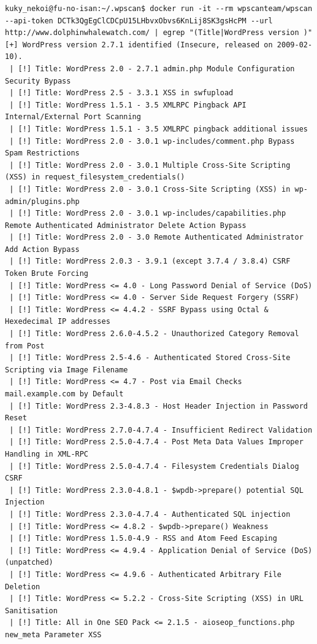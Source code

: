 \documentclass[11pt]{utalcaDoc}
\begin{document}
\begin{verbatim}
kuky_nekoi@fu-no-isan:~/.wpscan$ docker run -it --rm wpscanteam/wpscan --api-token DCTk3QgEgClCDCpU15LHbvxObvs6KnLij8SK3gsHcPM --url http://www.dolphinwhalewatch.com/ | egrep "(Title|WordPress version )"
[+] WordPress version 2.7.1 identified (Insecure, released on 2009-02-10).
 | [!] Title: WordPress 2.0 - 2.7.1 admin.php Module Configuration Security Bypass 
 | [!] Title: WordPress 2.5 - 3.3.1 XSS in swfupload
 | [!] Title: WordPress 1.5.1 - 3.5 XMLRPC Pingback API Internal/External Port Scanning
 | [!] Title: WordPress 1.5.1 - 3.5 XMLRPC pingback additional issues
 | [!] Title: WordPress 2.0 - 3.0.1 wp-includes/comment.php Bypass Spam Restrictions
 | [!] Title: WordPress 2.0 - 3.0.1 Multiple Cross-Site Scripting (XSS) in request_filesystem_credentials()
 | [!] Title: WordPress 2.0 - 3.0.1 Cross-Site Scripting (XSS) in wp-admin/plugins.php
 | [!] Title: WordPress 2.0 - 3.0.1 wp-includes/capabilities.php Remote Authenticated Administrator Delete Action Bypass
 | [!] Title: WordPress 2.0 - 3.0 Remote Authenticated Administrator Add Action Bypass
 | [!] Title: WordPress 2.0.3 - 3.9.1 (except 3.7.4 / 3.8.4) CSRF Token Brute Forcing
 | [!] Title: WordPress <= 4.0 - Long Password Denial of Service (DoS)
 | [!] Title: WordPress <= 4.0 - Server Side Request Forgery (SSRF)
 | [!] Title: WordPress <= 4.4.2 - SSRF Bypass using Octal & Hexedecimal IP addresses
 | [!] Title: WordPress 2.6.0-4.5.2 - Unauthorized Category Removal from Post
 | [!] Title: WordPress 2.5-4.6 - Authenticated Stored Cross-Site Scripting via Image Filename
 | [!] Title: WordPress <= 4.7 - Post via Email Checks mail.example.com by Default
 | [!] Title: WordPress 2.3-4.8.3 - Host Header Injection in Password Reset
 | [!] Title: WordPress 2.7.0-4.7.4 - Insufficient Redirect Validation
 | [!] Title: WordPress 2.5.0-4.7.4 - Post Meta Data Values Improper Handling in XML-RPC
 | [!] Title: WordPress 2.5.0-4.7.4 - Filesystem Credentials Dialog CSRF
 | [!] Title: WordPress 2.3.0-4.8.1 - $wpdb->prepare() potential SQL Injection
 | [!] Title: WordPress 2.3.0-4.7.4 - Authenticated SQL injection
 | [!] Title: WordPress <= 4.8.2 - $wpdb->prepare() Weakness
 | [!] Title: WordPress 1.5.0-4.9 - RSS and Atom Feed Escaping
 | [!] Title: WordPress <= 4.9.4 - Application Denial of Service (DoS) (unpatched)
 | [!] Title: WordPress <= 4.9.6 - Authenticated Arbitrary File Deletion
 | [!] Title: WordPress <= 5.2.2 - Cross-Site Scripting (XSS) in URL Sanitisation
 | [!] Title: All in One SEO Pack <= 2.1.5 - aioseop_functions.php new_meta Parameter XSS

\end{verbatim}
\end{document}
